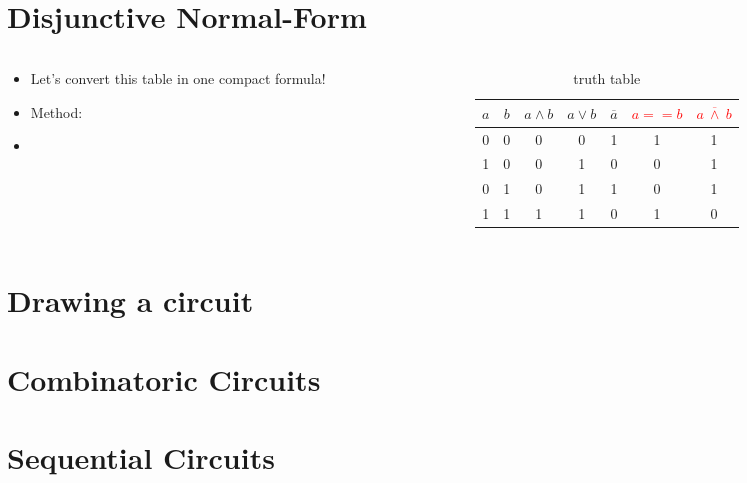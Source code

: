 \documentclass{beamer}
\begin{document}
\section{Disjunctive Normal-Form}
\begin{frame}
  
  \begin{columns}
  \begin{column}{6cm}
  \begin{itemize}
    \item Let's convert this table in one compact formula!
    \item Method: 
    \item 
  \end{itemize}
  \end{column}
  
    
  \begin{column}{6cm}
  \begin{table}[H]
  \centering
  \begin{tabular}{c|c|c|c|c|c|c}
  \textbf{$a$} & \textbf{$b$} & \textbf{$a\land b$} & \textbf{$a\lor b$} & \textbf{$\overline{a}$} & \textbf{ \textcolor{red}{$a==b$}}  & \textbf{ \textcolor{red}{$a\ \overline{\land}\  b$}} \\ \hline
  0          & 0          & 0            & 0            & 1          & 1        & 1      \\
  1          & 0          & 0            & 1            & 0          & 0        & 1   \\
  0          & 1          & 0            & 1            & 1          & 0        & 1  \\
  1          & 1          & 1            & 1            & 0          & 1        & 0  
  \end{tabular}
  \caption{truth table}
  \label{tab:truth}
  \end{table}
  \end{column}
  
  \end{columns}  
  
  
  
\end{frame}




\section{Drawing a circuit}
\section{Combinatoric Circuits}
\section{Sequential Circuits}
\end{document}
